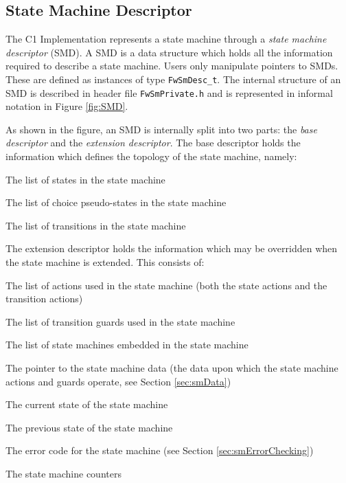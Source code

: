 \documentclass[manual]{../fwprofile}
\begin{document}
\subsection{State Machine Descriptor}\label{sec:smDesc}
The C1 Implementation represents a state machine through a \emph{state machine descriptor} (SMD). 
A SMD is a data structure which holds all the information required to describe a state machine. 
Users only manipulate pointers to SMDs. These are defined as instances of type \texttt{FwSmDesc\_t}. The internal structure of an SMD is described in header file \texttt{FwSmPrivate.h} and is represented in informal notation in Figure \ref{fig:SMD}. 

As shown in the figure, an SMD is internally split into two parts: the \emph{base descriptor} and the \emph{extension descriptor}. The base descriptor holds the information which defines the topology of the state machine, namely:

\begin{fw_itemize}
\item The list of states in the state machine
\item The list of choice pseudo-states in the state machine
\item The list of transitions in the state machine
\end{fw_itemize}

The extension descriptor holds the information which may be overridden when the state machine 
is extended. This consists of:

\begin{fw_itemize}
\item The list of actions used in the state machine (both the state actions and the transition actions)
\item The list of transition guards used in the state machine
\item The list of state machines embedded in the state machine
\item The pointer to the state machine data (the data upon which the state machine actions 
and guards operate, see Section \ref{sec:smData})
\item The current state of the state machine
\item The previous state of the state machine
\item The error code for the state machine (see Section \ref{sec:smErrorChecking})
\item The state machine counters
\end{fw_itemize}
\end{document}
